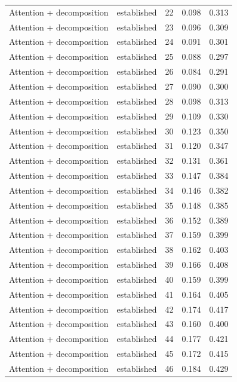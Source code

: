 \begin{tabular}{llrrr}
Attention + decomposition & established & 22 & 0.098 & 0.313 \\
Attention + decomposition & established & 23 & 0.096 & 0.309 \\
Attention + decomposition & established & 24 & 0.091 & 0.301 \\
Attention + decomposition & established & 25 & 0.088 & 0.297 \\
Attention + decomposition & established & 26 & 0.084 & 0.291 \\
Attention + decomposition & established & 27 & 0.090 & 0.300 \\
Attention + decomposition & established & 28 & 0.098 & 0.313 \\
Attention + decomposition & established & 29 & 0.109 & 0.330 \\
Attention + decomposition & established & 30 & 0.123 & 0.350 \\
Attention + decomposition & established & 31 & 0.120 & 0.347 \\
Attention + decomposition & established & 32 & 0.131 & 0.361 \\
Attention + decomposition & established & 33 & 0.147 & 0.384 \\
Attention + decomposition & established & 34 & 0.146 & 0.382 \\
Attention + decomposition & established & 35 & 0.148 & 0.385 \\
Attention + decomposition & established & 36 & 0.152 & 0.389 \\
Attention + decomposition & established & 37 & 0.159 & 0.399 \\
Attention + decomposition & established & 38 & 0.162 & 0.403 \\
Attention + decomposition & established & 39 & 0.166 & 0.408 \\
Attention + decomposition & established & 40 & 0.159 & 0.399 \\
Attention + decomposition & established & 41 & 0.164 & 0.405 \\
Attention + decomposition & established & 42 & 0.174 & 0.417 \\
Attention + decomposition & established & 43 & 0.160 & 0.400 \\
Attention + decomposition & established & 44 & 0.177 & 0.421 \\
Attention + decomposition & established & 45 & 0.172 & 0.415 \\
Attention + decomposition & established & 46 & 0.184 & 0.429 \\

\end{tabular}
